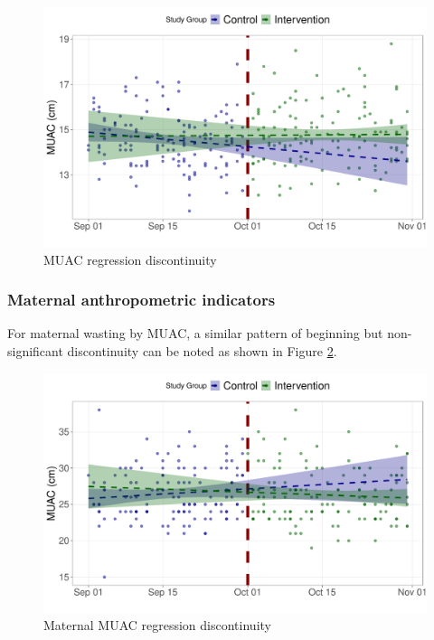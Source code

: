 \documentclass[12pt,a4paper]{article}
\begin{document}
\begin{figure}[H]

{\centering \includegraphics{kayinReport_files/figure-latex/rd5a-1} 

}

\caption{MUAC regression discontinuity}\label{fig:rd5a}
\end{figure}

\hypertarget{maternal-anthropometric-indicators}{%
\subsubsection{Maternal anthropometric indicators}\label{maternal-anthropometric-indicators}}

For maternal wasting by MUAC, a similar pattern of beginning but non-significant discontinuity can be noted as shown in Figure \ref{fig:rd7a}.

\begin{figure}[H]

{\centering \includegraphics{kayinReport_files/figure-latex/rd7a-1} 

}

\caption{Maternal MUAC regression discontinuity}\label{fig:rd7a}
\end{figure}
\end{document}
